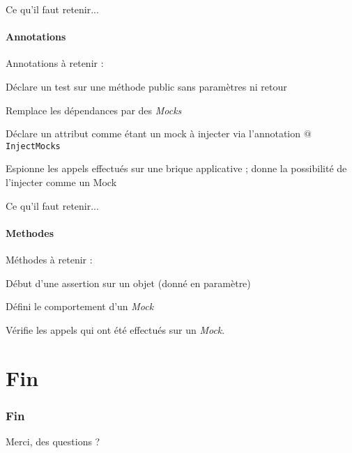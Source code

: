 \documentclass[compress]{beamer}%
\begin{document}
\begin{frame}{Ce qu'il faut retenir...}
	\framesubtitle{Annotations}
	
	Annotations à retenir :
	\begin{description}[<+->]
	\item[\texttt{$@$Test}] Déclare un test sur une méthode public sans paramètres ni retour
	\item[\texttt{$@$InjectMocks}] Remplace les dépendances par des \emph{Mocks}
	\item[\texttt{$@$Mock}] Déclare un attribut comme étant un mock à injecter via l'annotation \texttt{$@$InjectMocks}
	\item[\texttt{$@$Spy}] Espionne les appels effectués sur une brique applicative ; donne la possibilité de l'injecter comme un Mock
	\end{description}

\end{frame}

\begin{frame}{Ce qu'il faut retenir...}
	\framesubtitle{Methodes}
	
	Méthodes à retenir :
	\begin{description}[<+->]
	\item[\texttt{assertThat}] Début d'une assertion sur un objet (donné en paramètre)
	\item[\texttt{when}] Défini le comportement d'un \emph{Mock}
	\item[\texttt{verify}] Vérifie les appels qui ont été effectués sur un \emph{Mock}.
	\end{description}

\end{frame}

\section*{Fin}

\begin{frame}
	\frametitle{Fin}
	\begin{center}
		\huge
		Merci, des questions ?
	\end{center}
\end{frame}
\end{document}
